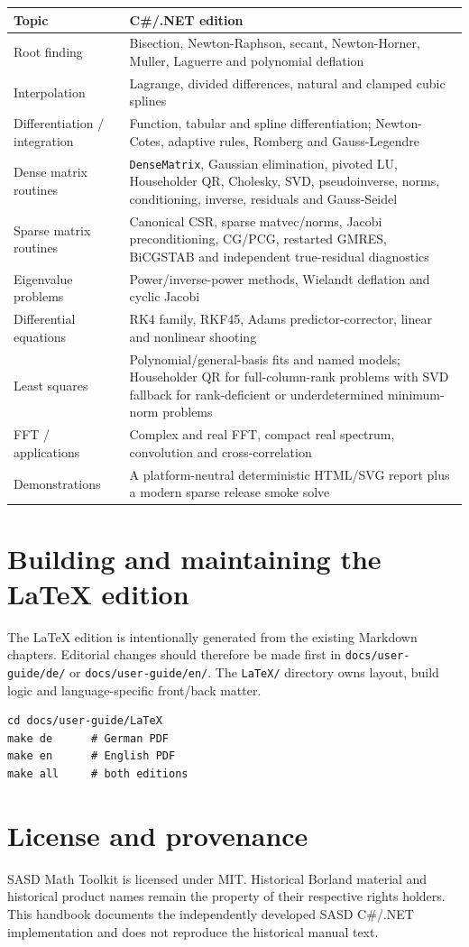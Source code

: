 \documentclass[11pt,a4paper,twoside,openright]{book}
\begin{document}
\begin{longtable}{@{}p{}p{}@{}}
\toprule
\textbf{Topic} & \textbf{C\#/.NET edition}\\
\midrule
Root finding & Bisection, Newton-Raphson, secant, Newton-Horner, Muller, Laguerre and polynomial deflation\\
Interpolation & Lagrange, divided differences, natural and clamped cubic splines\\
Differentiation / integration & Function, tabular and spline differentiation; Newton-Cotes, adaptive rules, Romberg and Gauss-Legendre\\
Dense matrix routines & \texttt{DenseMatrix}, Gaussian elimination, pivoted LU, Householder QR, Cholesky, SVD, pseudoinverse, norms, conditioning, inverse, residuals and Gauss-Seidel\\
Sparse matrix routines & Canonical CSR, sparse matvec/norms, Jacobi preconditioning, CG/PCG, restarted GMRES, BiCGSTAB and independent true-residual diagnostics\\
Eigenvalue problems & Power/inverse-power methods, Wielandt deflation and cyclic Jacobi\\
Differential equations & RK4 family, RKF45, Adams predictor-corrector, linear and nonlinear shooting\\
Least squares & Polynomial/general-basis fits and named models; Householder QR for full-column-rank problems with SVD fallback for rank-deficient or underdetermined minimum-norm problems\\
FFT / applications & Complex and real FFT, compact real spectrum, convolution and cross-correlation\\
Demonstrations & A platform-neutral deterministic HTML/SVG report plus a modern sparse release smoke solve\\
\bottomrule
\end{longtable}

\chapter{Building and maintaining the LaTeX edition}
The LaTeX edition is intentionally generated from the existing Markdown chapters. Editorial changes should therefore be made first in \texttt{docs/user-guide/de/} or \texttt{docs/user-guide/en/}. The \texttt{LaTeX/} directory owns layout, build logic and language-specific front/back matter.

\begin{lstlisting}
cd docs/user-guide/LaTeX
make de      # German PDF
make en      # English PDF
make all     # both editions
\end{lstlisting}

\backmatter
\chapter*{License and provenance}
SASD Math Toolkit is licensed under MIT. Historical Borland material and historical product names remain the property of their respective rights holders. This handbook documents the independently developed SASD C\#/.NET implementation and does not reproduce the historical manual text.
\end{document}
